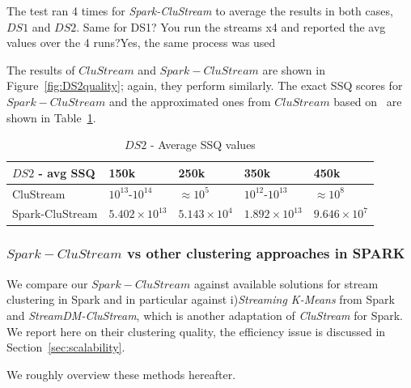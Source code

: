 The test ran 4 times for \textit{Spark-CluStream} to average the results in both cases, $DS1$ and $DS2$. \color{red} Same for DS1? You run the streams x4 and reported the avg values over the 4 runs?\color{black}\color{blue}Yes, the same process was used\color{black}

The results of $CluStream$ and $Spark-CluStream$ are shown in Figure~\ref{fig:DS2quality}; again, they perform similarly. The exact SSQ scores for $Spark-CluStream$ and the approximated ones from $CluStream$ based on~\cite{CluStream} are shown in Table~\ref{tab:DS2quality}.
\begin{table}[t]
\centering
\begin{tabular}{|l|l|l|l|l|}\hline
\textbf{$DS2$ - avg SSQ} & \textbf{150k} & \textbf{250k} & \textbf{350k} & \textbf{450k}\\\hline
CluStream & $10^{13}$-$10^{14}$ & $\approx 10^{5}$ & $10^{12}$-$10^{13}$ & $\approx 10^{8}$\\\hline
Spark-CluStream & $5.402\times10^{13}$ & $5.143\times10^{4}$ & $1.892\times10^{13}$ & $9.646\times10^7$\\\hline
  \end{tabular}
  \caption{$DS2$ - Average SSQ values}
  \label{tab:DS2quality}
\end{table}

\subsubsection{$Spark-CluStream$ vs other clustering approaches in SPARK}
\label{sec:expQuality-vs-SPARK}
We compare our $Spark-CluStream$ against available solutions for stream clustering in Spark and in particular against i)\textit{Streaming K-Means} from Spark and \textit{StreamDM-CluStream}, which is another adaptation of \textit{CluStream} for Spark. We report here on their clustering quality, the efficiency issue is discussed in Section~\ref{sec:scalability}.

We roughly overview these methods hereafter.



